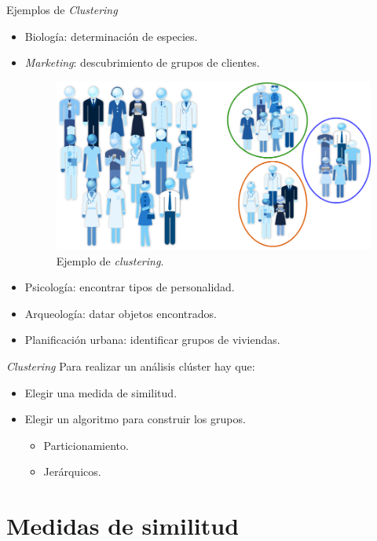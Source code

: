 \documentclass[spanish]{beamer}
\begin{document}
\begin{frame}{Ejemplos de \textit{Clustering}}
  \begin{itemize}
  \item Biología: determinación de especies.
  \item \textit{Marketing}: descubrimiento de grupos de clientes.
    \begin{figure}[H]
	\centering
	\includegraphics[scale=0.5]{ej_marketing}
	\caption{Ejemplo de \textit{clustering}. \cite{noauthor_understanding_nodate}}
\end{figure}
  \item Psicología: encontrar tipos de personalidad.
  \item Arqueología: datar objetos encontrados.
  \item Planificación urbana: identificar grupos de viviendas.
  \end{itemize}
\end{frame}

\begin{frame}{\textit{Clustering}}
  Para realizar un análisis clúster hay que:\break
  \begin{itemize}
  \item Elegir una medida de similitud.\break
  \item Elegir un algoritmo para construir los grupos.
    \begin{itemize}
    \item Particionamiento.
    \item Jerárquicos.
    \end{itemize}
  \end{itemize}
\end{frame}

\section{Medidas de similitud}
\end{document}
